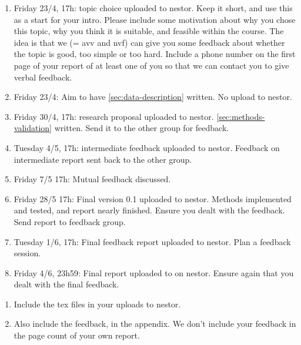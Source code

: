 \documentclass[report]{subfiles}
\begin{document}
\begin{enumerate}
\item Friday 23/4, 17h: topic choice uploaded to nestor.
  Keep it short, and use this as a start for your intro.
  Please include some motivation about why you chose this topic, why you think it is suitable, and feasible within the course.
  The idea is that we (= avv and nvf) can give you some feedback about whether the topic is good, too simple or too hard.
  Include a phone number on the first page of your report of at least one of you so that we can contact you to give verbal feedback.
\item  Friday 23/4: Aim to have \cref{sec:data-description} written. No upload to nestor.
\item   Friday 30/4, 17h: research proposal uploaded to nestor. \cref{sec:methods-validation} written.  Send it to the other group for feedback.
\item Tuesday 4/5, 17h: intermediate feedback uploaded to nestor. Feedback on intermediate report sent back to the other group.
\item  Friday 7/5 17h:   Mutual feedback discussed.
\item   Friday 28/5 17h: Final version 0.1 uploaded to nestor. Methods implemented and tested, and report nearly finished.
  Ensure you dealt with the feedback.
  Send report to feedback group.
\item Tuesday 1/6, 17h: Final  feedback report uploaded to nestor. Plan a feedback session.
\item  Friday 4/6, 23h59: Final report uploaded to on nestor.
  Ensure again that you dealt with the final feedback.
\end{enumerate}

\begin{enumerate}
\item Include the tex files in your uploads to nestor.
\item Also include the feedback, in the appendix.  We don't include your feedback in the page count of your own report.
\end{enumerate}
\end{document}
